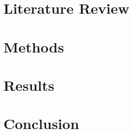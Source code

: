 \section{Literature Review} \label{sec:p1lr}


\section{Methods}

\section{Results}

\section{Conclusion}
